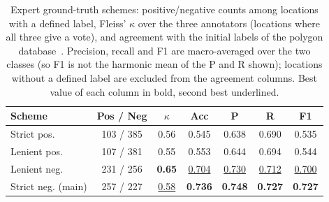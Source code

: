 \begin{table}[t]
\centering
\footnotesize
\setlength{\tabcolsep}{3pt}
\caption{Expert ground-truth schemes: positive/negative counts among locations with a defined label, Fleiss' $\kappa$ over the three annotators (locations where all three give a vote), and agreement with the initial labels of the polygon database~\cite{reece2023using}. Precision, recall and F1 are macro-averaged over the two classes (so F1 is not the harmonic mean of the P and R shown); locations without a defined label are excluded from the agreement columns. Best value of each column in bold, second best underlined.}
\label{tab:gt_metrics}
\begin{tabular}{lcccccc}
\toprule
Scheme & Pos / Neg & $\kappa$ & Acc & P & R & F1 \\
\midrule
Strict pos. & 103 / 385 & 0.56 & 0.545 & 0.638 & 0.690 & 0.535  \\
Lenient pos. & 107 / 381 & 0.55 & 0.553 & 0.644 & 0.694 & 0.544  \\
Lenient neg. & 231 / 256 & \textbf{0.65} & \underline{0.704} & \underline{0.730} & \underline{0.712} & \underline{0.700} \\
Strict neg. (main) & 257 / 227 & \underline{0.58} & \textbf{0.736} & \textbf{0.748} & \textbf{0.727} & \textbf{0.727} \\
\bottomrule
\end{tabular}
\end{table}
